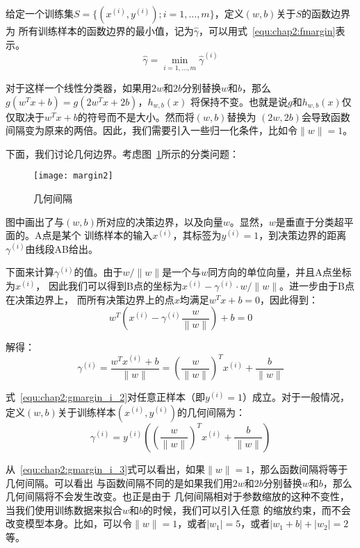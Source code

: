 给定一个训练集$S = \{(x^{(i)},y^{(i)});i = 1, ..., m\}$，定义$(w,b)$关于$S$的函数边界为
所有训练样本的函数边界的最小值，记为$\hat{\gamma}$，可以用式~\ref{equ:chap2:fmargin}表示。
\begin{equation}
  \label{equ:chap2:fmargin}
  \hat{\gamma} = \min_{i=1,...,m}\hat{\gamma}^{(i)}
\end{equation}

对于这样一个线性分类器，如果用$2w$和$2b$分别替换$w$和$b$，那么$g(w^Tx+b)=g(2w^Tx+2b)$，$h_{w,b}(x)$
将保持不变。也就是说$g$和$h_{w,b}(x)$仅仅取决于$w^Tx+b$的符号而不是大小。然而将$(w,b)$替换为
$(2w,2b)$会导致函数间隔变为原来的两倍。因此，我们需要引入一些归一化条件，比如令$\|w\|=1$。

下面，我们讨论几何边界。考虑图~\ref{fig:margin2}所示的分类问题：
\begin{figure}[ht] %
  \centering
  \texttt{[image: margin2]}
  \caption{几何间隔}
  \label{fig:margin2}
\end{figure}

图中画出了与$(w,b)$所对应的决策边界，以及向量$w$。显然，$w$是垂直于分类超平面的。A点是某个
训练样本的输入$x^{(i)}$，其标签为$y^{(i)} = 1$，到决策边界的距离$\gamma^{(i)}$由线段AB给出。

下面来计算$\gamma^{(i)}$的值。由于$w/\|w\|$是一个与$w$同方向的单位向量，并且A点坐标为$x^{(i)}$，
因此我们可以得到B点的坐标为$x^{(i)} - \gamma^{(i)} \cdot w/\|w\|$。进一步由于B点在决策边界上，
而所有决策边界上的点$x$均满足$w^Tx+b=0$，因此得到：
\begin{equation}
  \label{equ:chap2:gmargin_i_1}
  w^T\left(x^{(i)} - \gamma^{(i)}\frac{w}{\|w\|}\right) + b = 0
\end{equation}

解得：
\begin{equation}
  \label{equ:chap2:gmargin_i_2}
  \gamma^{(i)} = \frac{w^Tx^{(i)}+b}{\|w\|} = \left(\frac{w}{\|w\|}\right)^Tx^{(i)} + \frac{b}{\|w\|}
\end{equation}

式~\ref{equ:chap2:gmargin_i_2}对任意正样本（即$y^{(i)} = 1$）成立。对于一般情况，
定义$(w,b)$关于训练样本$(x^{(i)}, y^{(i)})$的几何间隔为：
\begin{equation}
  \label{equ:chap2:gmargin_i_3}
  \gamma^{(i)} = y^{(i)}\left(\left(\frac{w}{\|w\|}\right)^Tx^{(i)} + \frac{b}{\|w\|}\right)
\end{equation}

从~\ref{equ:chap2:gmargin_i_3}式可以看出，如果$\|w\|=1$，那么函数间隔将等于几何间隔。可以看出
与函数间隔不同的是如果我们用$2w$和$2b$分别替换$w$和$b$，那么几何间隔将不会发生改变。也正是由于
几何间隔相对于参数缩放的这种不变性，当我们使用训练数据来拟合$w$和$b$的时候，我们可以引入任意
的缩放约束，而不会改变模型本身。比如，可以令$\|w\|=1$，或者$|w_1|=5$，或者$|w_1+b|+|w_2|=2$等。

